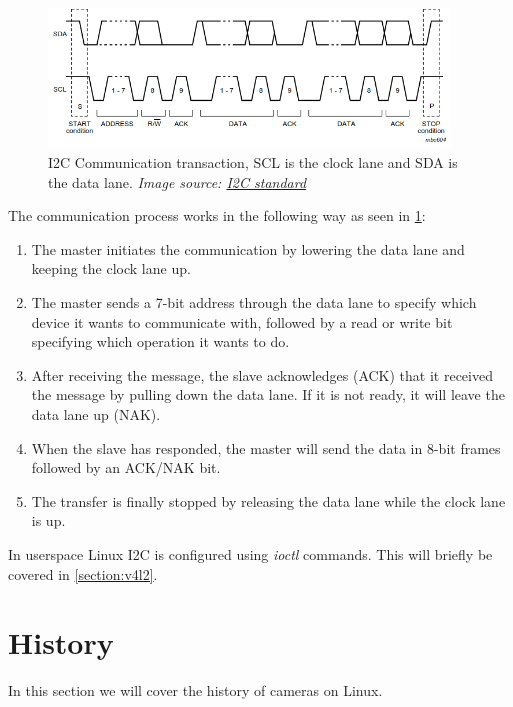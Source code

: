 \begin{figure}
    \begin{center}
        \includegraphics[width=0.95\textwidth]{figures/I2C_transaction.png}
    \end{center}
    \caption{I2C Communication transaction, SCL is the clock lane and SDA is the data lane.
        \textit{Image source: \href{https://www.nxp.com/docs/en/user-guide/UM10204.pdf}{I2C standard}}}\label{fig:I2C}
\end{figure}

The communication process works in the following way as seen in \cref{fig:I2C}:

\begin{enumerate}
    \item The master initiates the communication by lowering the data lane and
        keeping the clock lane up.

    \item The master sends a 7-bit address through the data lane to specify
        which device it wants to communicate with, followed by a read or write
        bit specifying which operation it wants to do.

    \item After receiving the message, the slave acknowledges (ACK) that it received
        the message by pulling down the data lane. If it is not ready, it will
        leave the data lane up (NAK).

    \item When the slave has responded, the master will send the data in 8-bit
        frames followed by an ACK/NAK bit.

    \item The transfer is finally stopped by releasing the data lane while the
        clock lane is up.
\end{enumerate}

In userspace Linux I2C is configured using \textit{ioctl} commands. This will
briefly be covered in \cref{section:v4l2}.

\section{History}
In this section we will cover the history of cameras on Linux.

